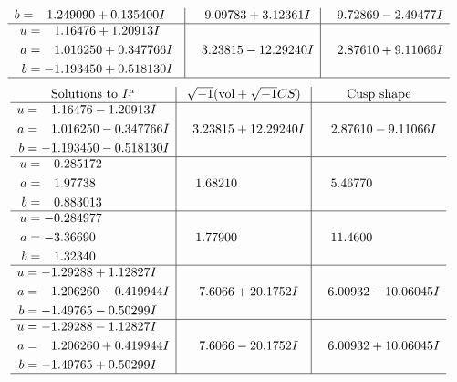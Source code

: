 \documentclass[1p]{elsarticle_modified}
\theoremstyle{definition}
\newcommand{\I}{\sqrt{-1}}
\begin{document}
$$\begin{array}{c|c|c}
\begin{aligned}
b &= \phantom{-}1.249090 + 0.135400 I\end{aligned}
 & \phantom{-}9.09783 + 3.12361 I & \phantom{-}9.72869 - 2.49477 I \\ \hline\begin{aligned}
u &= \phantom{-}1.16476 + 1.20913 I \\
a &= \phantom{-}1.016250 + 0.347766 I \\
b &= -1.193450 + 0.518130 I\end{aligned}
 & \phantom{-}3.23815 - 12.29240 I & \phantom{-}2.87610 + 9.11066 I\\
 \hline 
 \end{array}$$\newpage$$\begin{array}{c|c|c}  
\text{Solutions to }I^u_{1}& \I (\text{vol} + \sqrt{-1}CS) & \text{Cusp shape}\\
 \hline 
\begin{aligned}
u &= \phantom{-}1.16476 - 1.20913 I \\
a &= \phantom{-}1.016250 - 0.347766 I \\
b &= -1.193450 - 0.518130 I\end{aligned}
 & \phantom{-}3.23815 + 12.29240 I & \phantom{-}2.87610 - 9.11066 I \\ \hline\begin{aligned}
u &= \phantom{-}0.285172\phantom{ +0.000000I} \\
a &= \phantom{-}1.97738\phantom{ +0.000000I} \\
b &= \phantom{-}0.883013\phantom{ +0.000000I}\end{aligned}
 & \phantom{-}1.68210\phantom{ +0.000000I} & \phantom{-}5.46770\phantom{ +0.000000I} \\ \hline\begin{aligned}
u &= -0.284977\phantom{ +0.000000I} \\
a &= -3.36690\phantom{ +0.000000I} \\
b &= \phantom{-}1.32340\phantom{ +0.000000I}\end{aligned}
 & \phantom{-}1.77900\phantom{ +0.000000I} & \phantom{-}11.4600\phantom{ +0.000000I} \\ \hline\begin{aligned}
u &= -1.29288 + 1.12827 I \\
a &= \phantom{-}1.206260 - 0.419944 I \\
b &= -1.49765 - 0.50299 I\end{aligned}
 & \phantom{-}7.6066 + 20.1752 I & \phantom{-}6.00932 - 10.06045 I \\ \hline\begin{aligned}
u &= -1.29288 - 1.12827 I \\
a &= \phantom{-}1.206260 + 0.419944 I \\
b &= -1.49765 + 0.50299 I\end{aligned}
 & \phantom{-}7.6066 - 20.1752 I & \phantom{-}6.00932 + 10.06045 I\\
 \hline 
 \end{array}$$\newpage\newpage\renewcommand{\arraystretch}{1}
\end{document}
